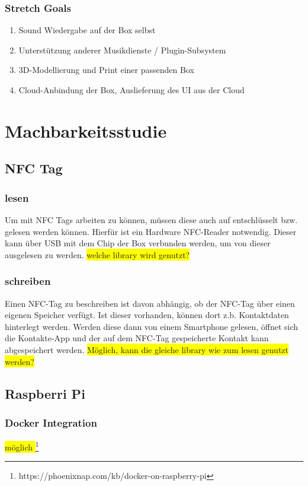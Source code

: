 \documentclass[10pt, a4paper, draft]{article}
\begin{document}
\subsubsection{Stretch Goals}
\begin{enumerate}
  \item Sound Wiedergabe auf der Box selbst
  \item Unterstützung anderer Musikdienste / Plugin-Subsystem
  \item 3D-Modellierung und Print einer passenden Box
  \item Cloud-Anbindung der Box, Auslieferung des UI aus der Cloud
\end{enumerate}

\section{Machbarkeitsstudie}

\subsection{NFC Tag}
\subsubsection{lesen}
Um mit NFC Tags arbeiten zu können, müssen diese auch auf entschlüsselt bzw. gelesen werden können.
Hierfür ist ein Hardware NFC-Reader notwendig. Dieser kann über USB mit dem Chip der Box verbunden werden, um von dieser ausgelesen zu werden.
\colorbox{yellow}{welche library wird genutzt?}

\subsubsection{schreiben}
Einen NFC-Tag zu beschreiben ist davon abhängig, ob der NFC-Tag über einen eigenen Speicher verfügt.
Ist dieser vorhanden, können dort z.b. Kontaktdaten hinterlegt werden. Werden diese dann von einem Smartphone gelesen, öffnet sich die Kontakte-App und der auf dem NFC-Tag gespeicherte Kontakt kann abgespeichert werden.
\colorbox{yellow}{Möglich, kann die gleiche library wie zum lesen genutzt werden?}

\subsection{Raspberri Pi}
\subsubsection{Docker Integration}
\colorbox{yellow}{möglich  }\footnote{https://phoenixnap.com/kb/docker-on-raspberry-pi}
\end{document}
